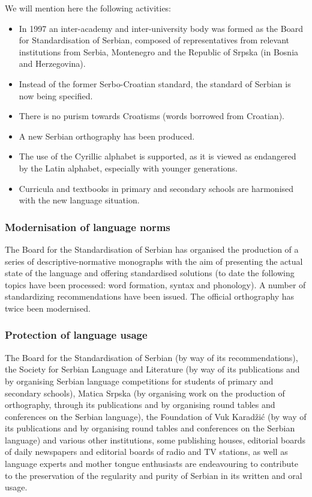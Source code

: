 {\begin{multicols}{2}
 We will mention here the following activities:
\begin{itemize}
\item In 1997 an inter-academy and inter-university body was formed as the Board for Standardisation of Serbian, \cite{BSSL} composed of representatives from relevant institutions from Serbia, Montenegro and the Republic of Srpska (in Bosnia and Herzegovina).
\item Instead of the former Serbo-Croatian standard, the standard of Serbian is now being specified.
\item There is no purism towards Croatisms (words borrowed from Croatian).
\item A new Serbian orthography has been produced.
\item The use of the Cyrillic alphabet is supported, as it is viewed as endangered by the Latin alphabet, especially with younger generations.
\item Curricula and textbooks in primary and secondary schools are harmonised with the new language situation.
 \end{itemize}

 \subsubsection {Modernisation of language norms}

The Board for the Standardisation of Serbian has organised the production of a series of descriptive-normative monographs with the aim of presenting the actual state of the language and offering standardised solutions (to date the following topics have been processed: word formation, syntax and phonology). A number of standardizing recommendations have been issued. The official orthography has twice been modernised.

 \subsubsection {Protection of language usage}
 
 
The Board for the Standardisation of Serbian (by way of its recommendations), the Society for Serbian Language and Literature (by way of its publications and by organising Serbian language competitions for students of primary and secondary schools), Matica Srpska (by organising work on the production of orthography, through its publications and by organising round tables and conferences on the Serbian language), the Foundation of Vuk Karadžić (by way of its publications and by organising round tables and conferences on the Serbian language) and various other institutions, some publishing houses, editorial boards of daily newspapers and editorial boards of radio and TV stations, as well as language experts and  mother tongue enthusiasts are endeavouring to contribute to the preservation of the regularity and purity of Serbian in its written and oral usage. 
 

\end{multicols}}
